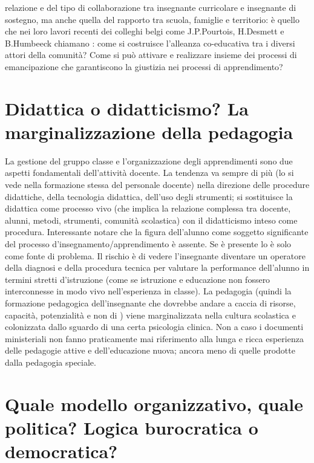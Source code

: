 relazione e del tipo di collaborazione tra insegnante curricolare e insegnante di sostegno, ma anche quella del rapporto tra scuola, famiglie e territorio: è quello che nei loro lavori recenti dei colleghi belgi come J.P.Pourtois, H.Desmett e B.Humbeeck chiamano : come si costruisce l'alleanza co-educativa tra i diversi attori della comunità? Come si può attivare e realizzare insieme dei processi di emancipazione che garantiscono la giustizia nei processi di apprendimento?
 \section*{Didattica o didatticismo? La marginalizzazione della pedagogia}
 
 La gestione del gruppo classe e l'organizzazione degli apprendimenti sono due aspetti fondamentali dell'attività docente. La tendenza va sempre di più (lo si vede nella formazione stessa del personale docente) nella direzione delle procedure didattiche, della tecnologia didattica, dell'uso degli strumenti; si sostituisce la didattica come processo vivo (che implica la relazione complessa tra docente, alunni, metodi, strumenti, comunità scolastica) con il didatticismo inteso come procedura. Interessante notare che la figura dell'alunno come soggetto significante del processo d'insegnamento/apprendimento è assente. Se è presente lo è solo come fonte di problema. Il rischio è di vedere l'insegnante diventare un operatore della diagnosi e della procedura tecnica per valutare la performance dell'alunno in termini stretti d'istruzione (come se istruzione e educazione non fossero interconnesse in modo vivo nell'esperienza in classe). La pedagogia (quindi la formazione pedagogica dell'insegnante che dovrebbe andare a caccia di risorse, capacità, potenzialità e non di ) viene marginalizzata nella cultura scolastica e colonizzata dallo sguardo di una certa psicologia clinica. Non a caso i documenti ministeriali non fanno praticamente mai riferimento alla lunga e ricca esperienza delle pedagogie attive e dell'educazione nuova; ancora meno di quelle prodotte dalla pedagogia speciale.
 \section*{Quale modello organizzativo, quale politica? Logica burocratica o democratica?}
 
